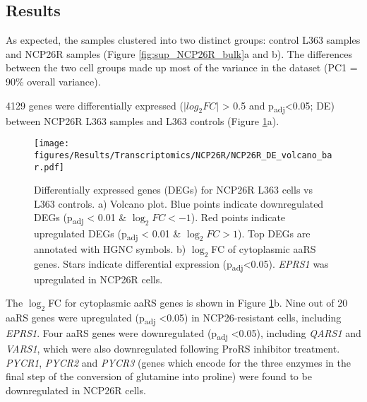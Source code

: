 \subsection{Results}
As expected, the samples clustered into two distinct groups: control L363 samples and NCP26R samples (Figure \ref{fig:sup_NCP26R_bulk}a and b).
The differences between the two cell groups made up most of the variance in the dataset (PC1 = 90\% overall variance).

4129 genes were differentially expressed ($\lvert log_{2}FC \rvert$ > 0.5 and p\textsubscript{adj}<0.05; DE) between NCP26R L363 samples and L363 controls (Figure \ref{fig:NCP26R_DE}a).
\begin{figure}[htb]
\centering
\texttt{[image: figures/Results/Transcriptomics/NCP26R/NCP26R\_DE\_volcano\_bar.pdf]}
\caption[Differentially expresed genes- NCP26R cells]{Differentially expressed genes (DEGs) for NCP26R L363 cells vs L363 controls.
a) Volcano plot. Blue points indicate downregulated DEGs (p\textsubscript{adj} < 0.01 \& $\log_{2}FC < -1$).
Red points indicate upregulated DEGs (p\textsubscript{adj} < 0.01 \& $\log_{2}FC > 1$).
Top DEGs are annotated with HGNC symbols.
b) $\log_{2}$FC of cytoplasmic aaRS genes.
Stars indicate differential expression (p\textsubscript{adj}<0.05).
\textit{EPRS1} was upregulated in NCP26R cells.
}
\label{fig:NCP26R_DE}
\end{figure}
The $\log_{2}$FC for cytoplasmic aaRS genes is shown in Figure \ref{fig:NCP26R_DE}b.
Nine out of 20 aaRS genes were upregulated (p\textsubscript{adj} <0.05) in NCP26-resistant cells, including \textit{EPRS1}.
Four aaRS genes were downregulated (p\textsubscript{adj} <0.05), including \textit{QARS1} and \textit{VARS1}, which were also downregulated following ProRS inhibitor treatment.
\textit{PYCR1}, \textit{PYCR2} and \textit{PYCR3} (genes which encode for the three enzymes in the final step of the conversion of glutamine into proline) were found to be downregulated in NCP26R cells.

